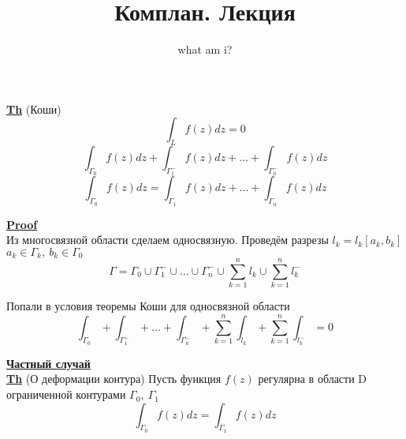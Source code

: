 \documentclass[a4paper]{article}
\begin{document}
\title{Комплан. Лекция}
\author{what am i?}
\maketitle

\begin{tcolorbox}
\textbf{\underline{Th}} (Коши) 
\[
    \int_{L} f(z) dz = 0
\]
\[
    \int_{\Gamma_0} f(z) dz + \int_{\Gamma_1^{-}} f(z) dz  + \dots + 
    \int_{\Gamma_n^{-}} f(z) dz 
\]
\[
    \int_{\Gamma_0} f(z) dz = \int_{\Gamma_1} f(z) dz  + \dots + 
    \int_{\Gamma_n} f(z) dz 
\]

\textbf{\underline{Proof}}\\
Из многосвязной области сделаем односвязную. Проведём разрезы $ l_k = l_k[a_k, b_k] $ 
$ a_k \in \Gamma_k, \ b_k \in \Gamma_0 $ 
\[
    \Gamma = \Gamma_0 \cup \Gamma_1^{-} \cup \dots \cup \Gamma_n^{-} \cup
    \sum_{k=1}^{n} l_k \cup \sum_{k=1}^{n} l_k^{-}
\]

Попали в условия теоремы Коши для односвязной области
\[
    \int_{\Gamma_0} + \int_{\Gamma_1^{-}} + \dots + \int_{\Gamma_n^{-}} + 
    \sum_{k=1}^{n} \int_{l_k} + \sum_{k=1}^{n} \int_{l_k^{-}} = 0 
\]
\end{tcolorbox}

\begin{tcolorbox}
\textbf{\underline{Частный случай}}\\ 
\textbf{\underline{Th}} (О деформации контура) Пусть функция $ f(z) $ регулярна в области 
D ограниченной контурами $ \Gamma_0, \ \Gamma_1 $ 
\[
    \int_{\Gamma_0}f(z) dz = \int_{\Gamma_1} f(z) dz
\]
\end{tcolorbox}
\end{document}
